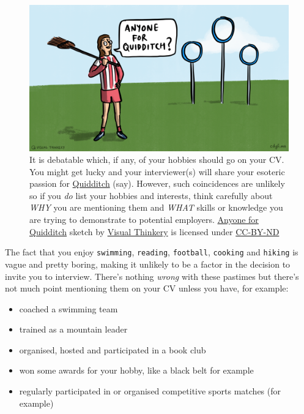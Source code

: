 \documentclass[
]{book}
\providecommand{\tightlist}{%
  \setlength{\itemsep}{0pt}\setlength{\parskip}{0pt}}
\begin{document}
\begin{figure}

{\centering \includegraphics[width=0.98\linewidth]{images/Anyone for quidditch} 

}

\caption{It is debatable which, if any, of your hobbies should go on your CV. You might get lucky and your interviewer(s) will share your esoteric passion for \href{https://en.wikipedia.org/wiki/Quidditch_(real-life_sport)}{Quidditch} (say). \citep{quidditch} However, such coincidences are unlikely so if you \emph{do} list your hobbies and interests, think carefully about \emph{WHY} you are mentioning them and \emph{WHAT} skills or knowledge you are trying to demonstrate to potential employers. \href{https://en.wikipedia.org/wiki/Anyone_for_tennis\%3F}{Anyone for Quidditch} sketch by \href{https://visualthinkery.com/}{Visual Thinkery} is licensed under \href{https://creativecommons.org/licenses/by-nd/4.0/}{CC-BY-ND}}\label{fig:quidditch-fig}
\end{figure}



The fact that you enjoy \texttt{swimming}, \texttt{reading}, \texttt{football}, \texttt{cooking} and \texttt{hiking} is vague and pretty boring, making it unlikely to be a factor in the decision to invite you to interview. There's nothing \emph{wrong} with these pastimes but there's not much point mentioning them on your CV unless you have, for example:

\begin{itemize}
\tightlist
\item
  coached a swimming team
\item
  trained as a mountain leader
\item
  organised, hosted and participated in a book club
\item
  won some awards for your hobby, like a black belt for example
\item
  regularly participated in or organised competitive sports matches (for example)
\end{itemize}
\end{document}
